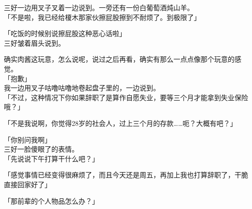 三好一边用叉子叉着一边说到。一旁还有一份白葡萄酒炖山羊。\\

「不是啦，我已经给榎木那家伙擦屁股擦到不耐烦了。到极限了」

「吃饭的时候别说擦屁股这种恶心话啦」\\

三好皱着眉头说到。

确实肉酱这玩意，怎么说呢，说过之后再看，确实有那么一点点像那个玩意的感觉。\\

「抱歉」\\

我一边用叉子咕噜咕噜地卷起盘子里的，一边说到。\\

「不过，这种情况下你如果辞职了是算作自愿失业，要等三个月才能拿到失业保险哦？」

「不是我说啊，你觉得28岁的社会人，过上三个月的存款……呃？大概有吧？」

「你别问我啊」\\

三好一脸傻眼了的表情。\\

「先说说下午打算干什么吧？」

「感觉事情已经变得很麻烦了，而且今天还是周五，再加上我也打算辞职了，干脆直接回家好了」

「那前辈的个人物品怎么办？」

